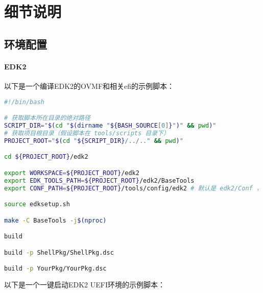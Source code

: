 \chapter{细节说明}
\section{环境配置}
\subsubsection{EDK2}\label{appendix:launchuefi}
以下是一个编译EDK2的OVMF和相关efi的示例脚本：
\begin{lstlisting}[language=bash]
#!/bin/bash

# 获取脚本所在目录的绝对路径
SCRIPT_DIR="$(cd "$(dirname "${BASH_SOURCE[0]}")" && pwd)"
# 获取项目根目录（假设脚本在 tools/scripts 目录下）
PROJECT_ROOT="$(cd "${SCRIPT_DIR}/../.." && pwd)"

cd ${PROJECT_ROOT}/edk2

export WORKSPACE=${PROJECT_ROOT}/edk2
export EDK_TOOLS_PATH=${PROJECT_ROOT}/edk2/BaseTools
export CONF_PATH=${PROJECT_ROOT}/tools/config/edk2 # 默认是 edk2/Conf ，为了优雅这里把它单独提出来

source edksetup.sh

make -C BaseTools -j$(nproc)

build

build -p ShellPkg/ShellPkg.dsc

build -p YourPkg/YourPkg.dsc

\end{lstlisting}
以下是一个一键启动EDK2 UEFI环境的示例脚本：
